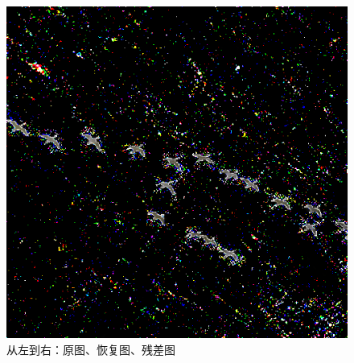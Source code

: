 \documentclass{article}
\begin{document}
\begin{figure}[h]
    	\includegraphics[scale=0.276]{../figures/E-5.png}
    	\caption{从左到右：原图、恢复图、残差图}
    \end{figure}
    \clearpage
\end{document}
